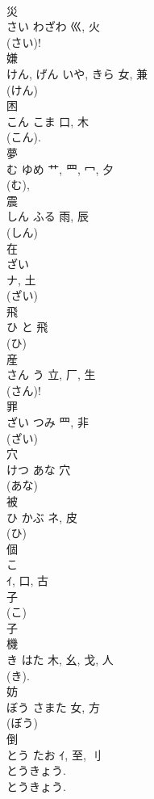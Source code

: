 \documentclass[8pt]{extreport}
\begin{document}
\begin{CJK}{UTF8}{min}
\\	災	
\\	さい	わざわ	巛, 火	
\\	(さい)! 
\\	嫌	
\\	けん, げん	いや, きら	女, 兼	
\\	(けん) 
\\	困	
\\	こん	こま	口, 木	
\\	(こん). 
\\	夢	
\\	む	ゆめ	艹, 罒, 冖, 夕	
\\	(む), 
\\	震	
\\	しん	ふる	雨, 辰	
\\	(しん) 
\\	在	
\\	ざい	
\\	ナ, 土		
\\	(ざい) 
\\	飛	
\\	ひ	と	飛	
\\	(ひ) 
\\	産	
\\	さん	う	立, 厂, 生	
\\	(さん)! 
\\	罪	
\\	ざい	つみ	罒, 非	
\\	(ざい) 
\\	穴	
\\	けつ	あな	穴	
\\	(あな) 
\\	被	
\\	ひ	かぶ	ネ, 皮	
\\	(ひ) 
\\	個	
\\	こ	
\\	ｲ, 口, 古	
\\	子
\\	(こ) 
\\	子
\\	機	
\\	き	はた	木, 幺, 戈, 人	
\\	(き). 
\\	妨	
\\	ぼう	さまた	女, 方	
\\	(ぼう) 
\\	倒	
\\	とう	たお	ｲ, 至, 刂	
\\	とうきょう. 
\\	とうきょう.	

\end{CJK}
\end{document}
